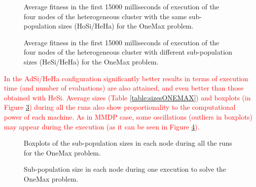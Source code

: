 \documentclass[final,1p,times]{elsarticle}
\begin{document}
\begin{figure}[htb]
\centering
{}
\caption{Average fitness in the first 15000 milliseconds of execution of the four nodes of the heterogeneous cluster with the same sub-population sizes (HoSi/HeHa) for the OneMax problem.}
\label{fig:gensonemaxhomosize}
\end{figure}

\begin{figure}[htb]
\centering
{}
\caption{Average fitness in the first 15000 milliseconds of execution of the four nodes of the heterogeneous cluster with different sub-population sizes (HeSi/HeHa) for the OneMax problem.}
\label{fig:gensonemaxheterosize}
\end{figure}


\textcolor{red}{In the AdSi/HeHa configuration significantly better results in terms of execution time (and number of evaluations) are also attained, and even better than those obtained with HeSi. Average sizes (Table \ref{table:sizesONEMAX}) and boxplots (in Figure \ref{fig:sizesONEMAX}) during all the runs also show proportionality to the computational power of each machine. As in MMDP case, some oscillations (outliers in boxplots) may appear during the execution (as it can be seen in Figure \ref{fig:sizesONEMAX1ejec}).}

\begin{figure}[htb]
\centering
{}
\caption{Boxplots of the sub-population sizes in each node during all the runs for the OneMax problem.}
\label{fig:sizesONEMAX}
\end{figure}

\begin{figure}[htb]
\centering
{}
\caption{Sub-population size in each node during one execution to solve the OneMax problem.}
\label{fig:sizesONEMAX1ejec}
\end{figure}

\begin{table}
\end{table}
\end{document}

